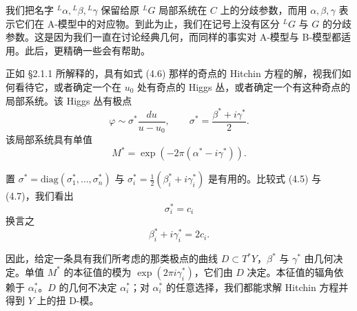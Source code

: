 
我们把名字 ${}^L\alpha,{}^L\beta,{}^L\gamma$ 保留给原 ${}^LG$ 局部系统在 $C$ 上的分歧参数，而用 $\alpha,\beta,\gamma$ 表示它们在 A-模型中的对应物。到此为止，我们在记号上没有区分 ${}^LG$ 与 $G$ 的分歧参数。这是因为我们一直在讨论经典几何，而同样的事实对 A-模型与 B-模型都适用。此后，更精确一些会有帮助。

正如 §2.1.1 所解释的，具有如式 (4.6) 那样的奇点的 Hitchin 方程的解，视我们如何看待它，或者确定一个在 $u_0$ 处有奇点的 Higgs 丛，或者确定一个有这种奇点的局部系统。该 Higgs 丛有极点
\begin{equation}\tag{4.7}
\varphi\sim\sigma^*\frac{du}{u-u_0},\qquad \sigma^*=\frac{\beta^*+i\gamma^*}{2}.
\end{equation}
该局部系统具有单值
\begin{equation}\tag{4.8}
M^*=\exp(-2\pi(\alpha^*-i\gamma^*)).
\end{equation}

置 $\sigma^*=\mathrm{diag}(\sigma_1^*,\dots,\sigma_n^*)$ 与 $\sigma_i^*=\frac{1}{2}(\beta_i^*+i\gamma_i^*)$ 是有用的。比较式 (4.5) 与 (4.7)，我们看出
\begin{equation}\tag{4.9}
\sigma_i^*=c_i
\end{equation}
换言之
\begin{equation}\tag{4.10}
\beta_i^*+i\gamma_i^*=2c_i.
\end{equation}

因此，给定一条具有我们所考虑的那类极点的曲线 $D\subset T^*Y$，$\beta^*$ 与 $\gamma^*$ 由几何决定。单值 $M^*$ 的本征值的模为 $\exp(2\pi i\gamma_i^*)$，它们由 $D$ 决定。本征值的辐角依赖于 $\alpha_i^*$。$D$ 的几何不决定 $\alpha_i^*$；对 $\alpha_i^*$ 的任意选择，我们都能求解 Hitchin 方程并得到 $Y$ 上的扭 D-模。


